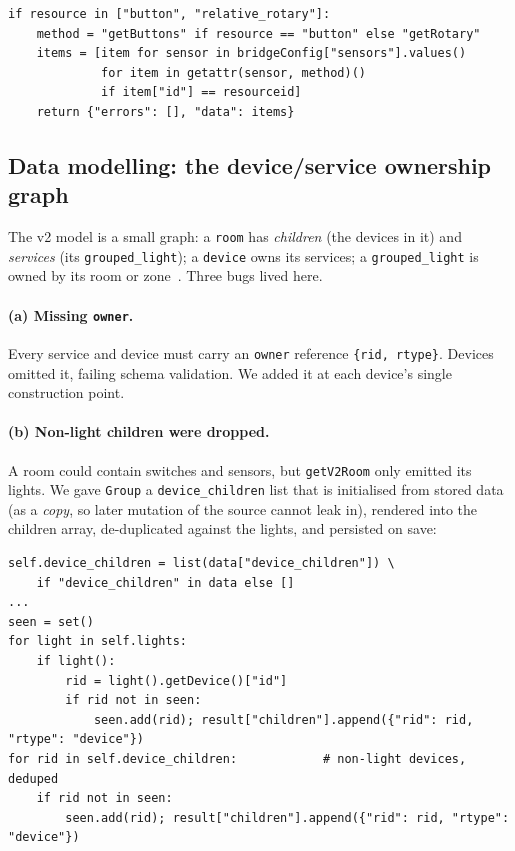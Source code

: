 \documentclass[11pt,a4paper]{article}
\newcommand{\code}[1]{\texttt{#1}}
\begin{document}
\begin{lstlisting}
if resource in ["button", "relative_rotary"]:
    method = "getButtons" if resource == "button" else "getRotary"
    items = [item for sensor in bridgeConfig["sensors"].values()
             for item in getattr(sensor, method)()
             if item["id"] == resourceid]
    return {"errors": [], "data": items}
\end{lstlisting}

\subsection{Data modelling: the device/service ownership graph}

The v2 model is a small graph: a \code{room} has \emph{children} (the devices in
it) and \emph{services} (its \code{grouped\_light}); a \code{device} owns its
services; a \code{grouped\_light} is owned by its room or zone~\cite{openhue,huev2}. Three bugs lived
here.

\paragraph{(a) Missing \texttt{owner}.} Every service and device must carry an
\code{owner} reference \code{\{rid, rtype\}}. Devices omitted it, failing schema
validation. We added it at each device's single construction point.

\paragraph{(b) Non-light children were dropped.} A room could contain switches
and sensors, but \code{getV2Room} only emitted its lights. We gave \code{Group}
a \code{device\_children} list that is initialised from stored data (as a
\emph{copy}, so later mutation of the source cannot leak in), rendered into the
children array, de-duplicated against the lights, and persisted on save:

\begin{lstlisting}
self.device_children = list(data["device_children"]) \
    if "device_children" in data else []
...
seen = set()
for light in self.lights:
    if light():
        rid = light().getDevice()["id"]
        if rid not in seen:
            seen.add(rid); result["children"].append({"rid": rid, "rtype": "device"})
for rid in self.device_children:            # non-light devices, deduped
    if rid not in seen:
        seen.add(rid); result["children"].append({"rid": rid, "rtype": "device"})
\end{lstlisting}
\end{document}
